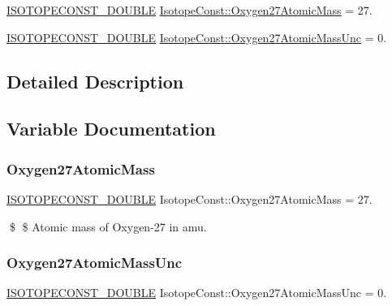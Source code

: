 \begin{DoxyCompactItemize}
\item 
\mbox{\hyperlink{group___isotope_const-_macros_ga8f45a7272ce02c0b4c65c44636ed719a}{I\+S\+O\+T\+O\+P\+E\+C\+O\+N\+S\+T\+\_\+\+D\+O\+U\+B\+LE}} \mbox{\hyperlink{group___isotope_const-_oxygen-_o27_gab97f9fb0b0d0ea3cf1b8a60ab5b98aed}{Isotope\+Const\+::\+Oxygen27\+Atomic\+Mass}} = 27.
\item 
\mbox{\hyperlink{group___isotope_const-_macros_ga8f45a7272ce02c0b4c65c44636ed719a}{I\+S\+O\+T\+O\+P\+E\+C\+O\+N\+S\+T\+\_\+\+D\+O\+U\+B\+LE}} \mbox{\hyperlink{group___isotope_const-_oxygen-_o27_ga633386fb7cfd1407864694bf3d5de614}{Isotope\+Const\+::\+Oxygen27\+Atomic\+Mass\+Unc}} = 0.
\end{DoxyCompactItemize}


\subsection{Detailed Description}


\subsection{Variable Documentation}
\mbox{\label{group___isotope_const-_oxygen-_o27_gab97f9fb0b0d0ea3cf1b8a60ab5b98aed}} 
\subsubsection{\texorpdfstring{Oxygen27\+Atomic\+Mass}{Oxygen27AtomicMass}}
{\footnotesize\ttfamily \mbox{\hyperlink{group___isotope_const-_macros_ga8f45a7272ce02c0b4c65c44636ed719a}{I\+S\+O\+T\+O\+P\+E\+C\+O\+N\+S\+T\+\_\+\+D\+O\+U\+B\+LE}} Isotope\+Const\+::\+Oxygen27\+Atomic\+Mass = 27.}

\$ \$ Atomic mass of Oxygen-\/27 in amu. \mbox{\label{group___isotope_const-_oxygen-_o27_ga633386fb7cfd1407864694bf3d5de614}} 
\subsubsection{\texorpdfstring{Oxygen27\+Atomic\+Mass\+Unc}{Oxygen27AtomicMassUnc}}
{\footnotesize\ttfamily \mbox{\hyperlink{group___isotope_const-_macros_ga8f45a7272ce02c0b4c65c44636ed719a}{I\+S\+O\+T\+O\+P\+E\+C\+O\+N\+S\+T\+\_\+\+D\+O\+U\+B\+LE}} Isotope\+Const\+::\+Oxygen27\+Atomic\+Mass\+Unc = 0.}

